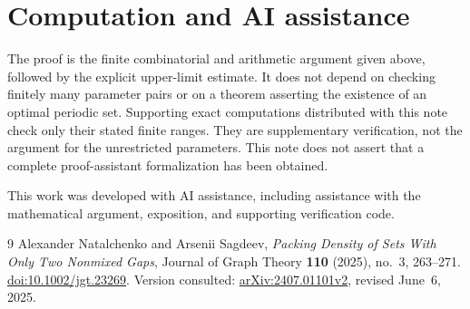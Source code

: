 \documentclass[11pt]{article}
\theoremstyle{remark}
\begin{document}
\section*{Computation and AI assistance}

The proof is the finite combinatorial and arithmetic argument given
above, followed by the explicit upper-limit estimate. It does not
depend on checking finitely many parameter pairs or on a theorem
asserting the existence of an optimal periodic set. Supporting exact
computations distributed with this note check only their stated
finite ranges. They are supplementary verification, not the argument
for the unrestricted parameters. This note does not assert that a
complete proof-assistant formalization has been obtained.

This work was developed with AI assistance, including assistance with
the mathematical argument, exposition, and supporting verification
code.

\begin{thebibliography}{9}
Alexander Natalchenko and Arsenii Sagdeev,
\emph{Packing Density of Sets With Only Two Nonmixed Gaps},
Journal of Graph Theory \textbf{110} (2025), no.~3, 263--271.
\href{https://doi.org/10.1002/jgt.23269}{doi:10.1002/jgt.23269}.
Version consulted: \href{https://arxiv.org/abs/2407.01101v2}
{arXiv:2407.01101v2}, revised June~6, 2025.
\end{thebibliography}
\end{document}
